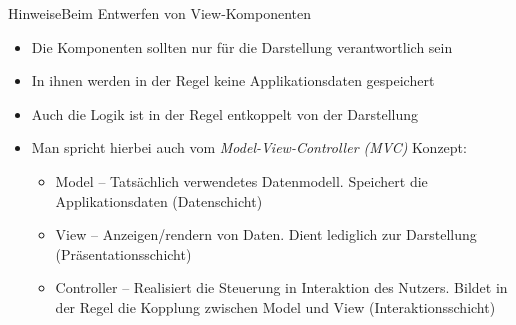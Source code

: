 \begin{frame}{Hinweise}{Beim Entwerfen von View-Komponenten}
    \begin{itemize}
        \item Die Komponenten sollten nur für die Darstellung verantwortlich sein
        \item In ihnen werden in der Regel keine Applikationsdaten gespeichert
        \item Auch die Logik ist in der Regel entkoppelt von der Darstellung
        \item Man spricht hierbei auch vom \textit{Model-View-Controller (MVC)} Konzept:
        \begin{itemize}
            \item Model -- Tatsächlich verwendetes Datenmodell. Speichert die Applikationsdaten (Datenschicht)
            \item View -- Anzeigen/rendern von Daten. Dient lediglich zur Darstellung (Präsentationsschicht)
            \item Controller -- Realisiert die Steuerung in Interaktion des Nutzers. Bildet in der Regel die Kopplung zwischen Model und View (Interaktionsschicht)
        \end{itemize}
    \end{itemize}
\end{frame}